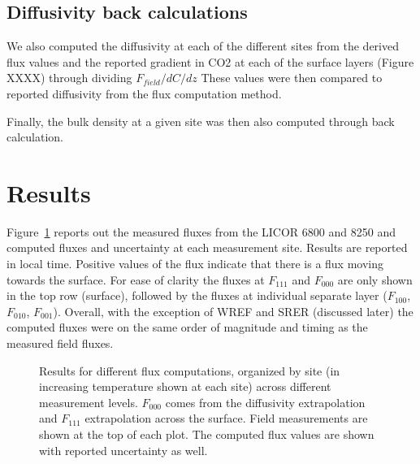 \documentclass[
  letterpaper,
  DIV=11,
  numbers=noendperiod]{scrartcl}
\begin{document}
\subsection{Diffusivity back
calculations}\label{diffusivity-back-calculations}

We also computed the diffusivity at each of the different sites from the
derived flux values and the reported gradient in CO2 at each of the
surface layers (Figure XXXX) through dividing \(F_{field}/dC/dz\) These
values were then compared to reported diffusivity from the flux
computation method.

Finally, the bulk density at a given site was then also computed through
back calculation.

\section{Results}\label{results}

Figure~\ref{fig-flux-results} reports out the measured fluxes from the
LICOR 6800 and 8250 and computed fluxes and uncertainty at each
measurement site. Results are reported in local time. Positive values of
the flux indicate that there is a flux moving towards the surface. For
ease of clarity the fluxes at \(F_{111}\) and \(F_{000}\) are only shown
in the top row (surface), followed by the fluxes at individual separate
layer (\(F_{100}\), \(F_{010}\), \(F_{001}\)). Overall, with the
exception of WREF and SRER (discussed later) the computed fluxes were on
the same order of magnitude and timing as the measured field fluxes.

\begin{figure}


\caption{\label{fig-flux-results}Results for different flux
computations, organized by site (in increasing temperature shown at each
site) across different measurement levels. \(F_{000}\) comes from the
diffusivity extrapolation and \(F_{111}\) extrapolation across the
surface. Field measurements are shown at the top of each plot. The
computed flux values are shown with reported uncertainty as well.}

\end{figure}%
\end{document}
